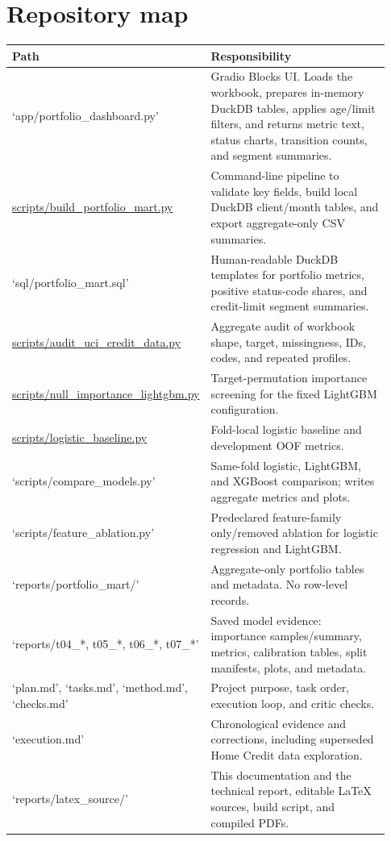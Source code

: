 \documentclass[11pt,letterpaper]{article}
\begin{document}
\section{Repository map}
\begin{longtable}{p{0.31\linewidth}p{0.62\linewidth}}
\toprule
Path & Responsibility \\
\midrule
\endhead
`app/portfolio\_dashboard.py' & Gradio Blocks UI. Loads the workbook, prepares in-memory DuckDB tables, applies age/limit filters, and returns metric text, status charts, transition counts, and segment summaries. \\
\url{scripts/build_portfolio_mart.py} & Command-line pipeline to validate key fields, build local DuckDB client/month tables, and export aggregate-only CSV summaries. \\
`sql/portfolio\_mart.sql' & Human-readable DuckDB templates for portfolio metrics, positive status-code shares, and credit-limit segment summaries. \\
\url{scripts/audit_uci_credit_data.py} & Aggregate audit of workbook shape, target, missingness, IDs, codes, and repeated profiles. \\
\url{scripts/null_importance_lightgbm.py} & Target-permutation importance screening for the fixed LightGBM configuration. \\
\url{scripts/logistic_baseline.py} & Fold-local logistic baseline and development OOF metrics. \\
`scripts/compare\_models.py' & Same-fold logistic, LightGBM, and XGBoost comparison; writes aggregate metrics and plots. \\
`scripts/feature\_ablation.py' & Predeclared feature-family only/removed ablation for logistic regression and LightGBM. \\
`reports/portfolio\_mart/' & Aggregate-only portfolio tables and metadata. No row-level records. \\
`reports/t04\_*, t05\_*, t06\_*, t07\_*' & Saved model evidence: importance samples/summary, metrics, calibration tables, split manifests, plots, and metadata. \\
`plan.md', `tasks.md', `method.md', `checks.md' & Project purpose, task order, execution loop, and critic checks. \\
`execution.md' & Chronological evidence and corrections, including superseded Home Credit data exploration. \\
`reports/latex\_source/' & This documentation and the technical report, editable LaTeX sources, build script, and compiled PDFs. \\
\bottomrule
\end{longtable}
\end{document}
